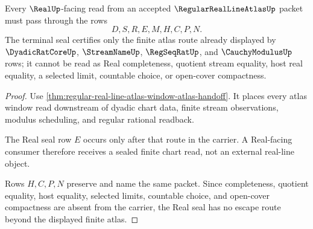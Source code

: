 \begin{theorem}
\label{thm:regular-real-line-atlas-real-seal-nonescape}
Every $\RealUp$-facing read from an accepted $\RegularRealLineAtlasUp$ packet must pass through the rows
$$
D,S,R,E,M,H,C,P,N .
$$
The terminal seal certifies only the finite atlas route already displayed by $\DyadicRatCoreUp$, $\StreamNameUp$, $\RegSeqRatUp$, and $\CauchyModulusUp$ rows; it cannot be read as Real completeness, quotient stream equality, host real equality, a selected limit, countable choice, or open-cover compactness.
\end{theorem}
\begin{proof}
Use \autoref{thm:regular-real-line-atlas-window-atlas-handoff}. It places every atlas window read downstream of dyadic chart data, finite stream observations, modulus scheduling, and regular rational readback.

The Real seal row $E$ occurs only after that route in the carrier. A Real-facing consumer therefore receives a sealed finite chart read, not an external real-line object.

Rows $H,C,P,N$ preserve and name the same packet. Since completeness, quotient equality, host equality, selected limits, countable choice, and open-cover compactness are absent from the carrier, the Real seal has no escape route beyond the displayed finite atlas.
\end{proof}




